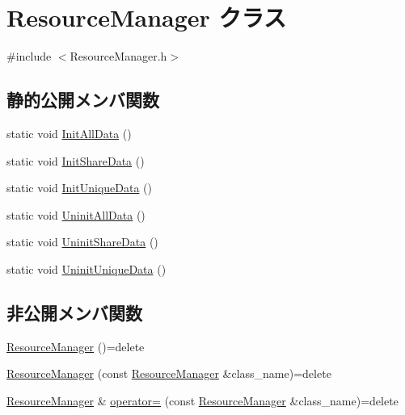\hypertarget{class_resource_manager}{}\section{Resource\+Manager クラス}
\label{class_resource_manager}


{\ttfamily \#include $<$Resource\+Manager.\+h$>$}

\subsection*{静的公開メンバ関数}
\begin{DoxyCompactItemize}
\item 
static void \mbox{\hyperlink{class_resource_manager_aa91dc794c10825768c5d85e69342632b}{Init\+All\+Data}} ()
\item 
static void \mbox{\hyperlink{class_resource_manager_af9be166f96250b01b9070a262cdb5d34}{Init\+Share\+Data}} ()
\item 
static void \mbox{\hyperlink{class_resource_manager_ab1ea00fb7eb4006bb9cbb48612da2c79}{Init\+Unique\+Data}} ()
\item 
static void \mbox{\hyperlink{class_resource_manager_a8d96f0a74a92212e8b2948467bb3cac7}{Uninit\+All\+Data}} ()
\item 
static void \mbox{\hyperlink{class_resource_manager_a786915d9c4df5a023a43db8c5332cb93}{Uninit\+Share\+Data}} ()
\item 
static void \mbox{\hyperlink{class_resource_manager_abcb135906cb991a49ec6e8c8db057de1}{Uninit\+Unique\+Data}} ()
\end{DoxyCompactItemize}
\subsection*{非公開メンバ関数}
\begin{DoxyCompactItemize}
\item 
\mbox{\hyperlink{class_resource_manager_aef25bb48c1ff96b8179c9f9cbb547831}{Resource\+Manager}} ()=delete
\item 
\mbox{\hyperlink{class_resource_manager_a977c29f32d3d775f9079e35b9c3bf733}{Resource\+Manager}} (const \mbox{\hyperlink{class_resource_manager}{Resource\+Manager}} \&class\+\_\+name)=delete
\item 
\mbox{\hyperlink{class_resource_manager}{Resource\+Manager}} \& \mbox{\hyperlink{class_resource_manager_a9c420ee8ffde51a27fe6ca37229ffa83}{operator=}} (const \mbox{\hyperlink{class_resource_manager}{Resource\+Manager}} \&class\+\_\+name)=delete
\end{DoxyCompactItemize}


